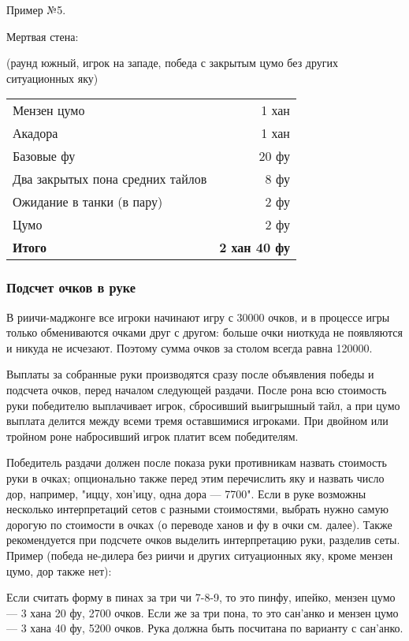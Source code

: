Пример №5.


Мертвая стена: 

(раунд южный, игрок на западе, победа с закрытым цумо без других ситуационных яку)

\noindent\begin{tabular}{lr}
	Мензен цумо & 1 хан \\
	Акадора & 1 хан \\
	Базовые фу & 20 фу \\
	Два закрытых пона средних тайлов & 8 фу \\
	Ожидание в танки (в пару) & 2 фу \\
	Цумо & 2 фу \\
	\midrule
	\textbf{Итого} & \textbf{2 хан 40 фу} \\
\end{tabular}

\subsubsection{Подсчет очков в руке}

В риичи-маджонге все игроки начинают игру с 30000 очков, и в процессе игры только обмениваются очками друг с другом: больше очки ниоткуда не появляются и никуда не исчезают. Поэтому сумма очков за столом всегда равна 120000.

Выплаты за собранные руки производятся сразу после объявления победы и подсчета очков, перед началом следующей раздачи. После рона всю стоимость руки победителю выплачивает игрок, сбросивший выигрышный тайл, а при цумо выплата делится между всеми тремя оставшимися игроками. При двойном или тройном роне набросивший игрок платит всем победителям.

Победитель раздачи должен после показа руки противникам назвать стоимость руки в очках; опционально также перед этим перечислить яку и назвать число дор, например, "иццу, хон’ицу, одна дора --- 7700". Если в руке возможны несколько интерпретаций сетов с разными стоимостями, выбрать нужно самую дорогую по стоимости в очках (о переводе ханов и фу в очки см. далее). Также рекомендуется при подсчете очков выделить интерпретацию руки, разделив сеты. Пример (победа не-дилера без риичи и других ситуационных яку, кроме мензен цумо, дор также нет):


Если считать форму в пинах за три чи 7-8-9, то это пинфу, ипейко, мензен цумо --- 3 хана 20 фу, 2700 очков. Если же за три пона, то это сан’анко и мензен цумо --- 3 хана 40 фу, 5200 очков. Рука должна быть посчитана по варианту с сан’анко.

